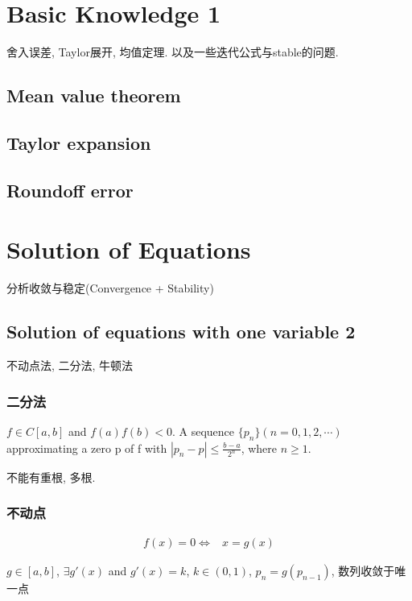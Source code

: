 \documentclass{source/Paper}
\begin{document}
\tableofcontents
\section{Basic Knowledge 1}
舍入误差, Taylor展开, 均值定理. 以及一些迭代公式与stable的问题. 

    \subsection{Mean value theorem}

    \subsection{Taylor expansion}

    \subsection{Roundoff  error}

\section{Solution of Equations}
    分析收敛与稳定(Convergence + Stability)

    \subsection{Solution of equations with one variable 2}
    不动点法, 二分法, 牛顿法
    \subsubsection{二分法}
    \begin{theorem}
        $f \in C[a,b]$ and $f(a)f(b)<0$. A sequence $\{p_n\}(n=0,1,2,\cdots)$ approximating a zero p of f with 
        $\left| p_n-p \right|\le\frac{b-a}{2^n}$, where $n\ge1$.
    \end{theorem}

    不能有重根, 多根. 

    \subsubsection{不动点}
    \begin{align*}
        f(x)=0 \Longleftrightarrow &x=g(x)
    \end{align*}

    \begin{theorem}
        $g\in [a,b]$, $\exists g'(x)$ and $g'(x)=k$, $k\in(0,1)$, $p_n=g(p_{n-1})$, 数列收敛于唯一点
    \end{theorem}
\end{document}
